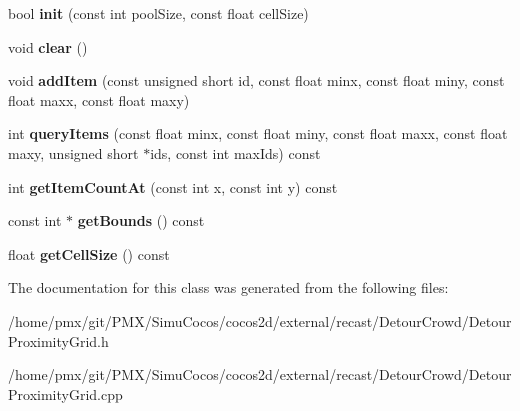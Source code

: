 \begin{DoxyCompactItemize}
bool {\bfseries init} (const int pool\+Size, const float cell\+Size)
\item 
\mbox{\label{classdtProximityGrid_abfbfdb91797c4414d1201d761d9c1a94}} 
void {\bfseries clear} ()
\item 
\mbox{\label{classdtProximityGrid_ad19f5adb495c35e386c6e1ba314a2b59}} 
void {\bfseries add\+Item} (const unsigned short id, const float minx, const float miny, const float maxx, const float maxy)
\item 
\mbox{\label{classdtProximityGrid_a4ee1269c36500bb20d3891a2363c5ea8}} 
int {\bfseries query\+Items} (const float minx, const float miny, const float maxx, const float maxy, unsigned short $\ast$ids, const int max\+Ids) const
\item 
\mbox{\label{classdtProximityGrid_ac788d2fbab7612826abeeab20a4f94fb}} 
int {\bfseries get\+Item\+Count\+At} (const int x, const int y) const
\item 
\mbox{\label{classdtProximityGrid_a9850e14d04f7d60909c46bec50c5ef65}} 
const int $\ast$ {\bfseries get\+Bounds} () const
\item 
\mbox{\label{classdtProximityGrid_aca646eb6926a096bb8062e7bf3a09945}} 
float {\bfseries get\+Cell\+Size} () const
\end{DoxyCompactItemize}


The documentation for this class was generated from the following files\+:\begin{DoxyCompactItemize}
\item 
/home/pmx/git/\+P\+M\+X/\+Simu\+Cocos/cocos2d/external/recast/\+Detour\+Crowd/Detour\+Proximity\+Grid.\+h\item 
/home/pmx/git/\+P\+M\+X/\+Simu\+Cocos/cocos2d/external/recast/\+Detour\+Crowd/Detour\+Proximity\+Grid.\+cpp\end{DoxyCompactItemize}
